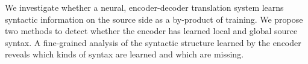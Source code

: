We investigate whether a neural, encoder-decoder translation system learns syntactic information on the source side as a by-product of training. We propose two methods to detect whether the encoder has learned local and global source syntax. A fine-grained analysis of the syntactic structure learned by the encoder reveals which kinds of syntax are learned and which are missing.
